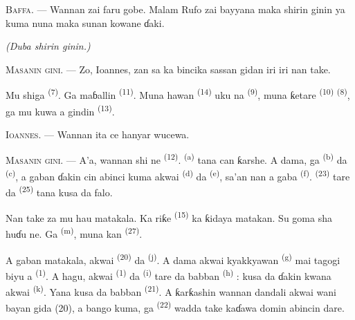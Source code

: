 \textsc{Baffa}. --- Wannan zai faru gobe. Malam Rufo zai bayyana maka
shirin ginin ya kuma nuna maka sunan kowane ɗaki.

\VUsaut{3.0mm}
\VUsaut{2.4mm}

{\centering\textit{(Duba shirin ginin.)}\par}
\VUsaut{2.4mm}

\textsc{Masanin gini}. --- Zo, Ioannes, zan sa ka bincika sassan gidan
iri iri nan take.

Mu shiga  \textsuperscript{(7)}. Ga maɓallin
 \textsuperscript{(11)}. Muna hawan 
\textsuperscript{(14)} uku na 
\textsuperscript{(9)}, muna ƙetare  \textsuperscript{(10)}
 \textsuperscript{(8)}, ga mu kuwa a gindin
 \textsuperscript{(13)}.

\textsc{Ioannes}. --- Wannan ita ce hanyar wucewa.

\textsc{Masanin gini}. --- A’a, wannan shi ne 
\textsuperscript{(12)}.  \textsuperscript{(a)}
tana can ƙarshe. A dama, ga  \textsuperscript{(b)} da
 \textsuperscript{(c)}, a gaban ɗakin cin
abinci kuma akwai  \textsuperscript{(d)} da
 \textsuperscript{(e)}, sa’an nan a gaba
 \textsuperscript{(f)}. 
\textsuperscript{(23)} tare da 
\textsuperscript{(25)} tana kusa da falo.

Nan take za mu hau matakala. Ka riƙe 
\textsuperscript{(15)} ka ƙidaya matakan. Su goma sha huɗu ne. Ga
 \textsuperscript{(m)}, muna kan  \textsuperscript{(27)}.

\VUsaut{3.0mm}
\VUsaut{3.0mm}

A gaban matakala, akwai  \textsuperscript{(20)} da
 \textsuperscript{(j)}. A dama akwai kyakkyawan
 \textsuperscript{(g)} mai tagogi biyu a
 \textsuperscript{(1)}. A hagu, akwai  \textsuperscript{(1)} da 
\textsuperscript{(i)} tare da babban 
\textsuperscript{(h)} : kusa da ɗakin kwana akwai 
\textsuperscript{(k)}. Yana kusa da babban 
\textsuperscript{(21)}. A ƙarƙashin wannan dandali akwai wani bayan
gida (20), a bango kuma, ga  \textsuperscript{(22)}
wadda take kaɗawa domin abincin dare.

